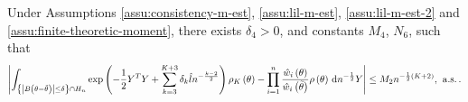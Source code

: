 \begin{lemma}
\label{lem:central-expansion-post-prod-2}%
 Under  Assumptions \ref{assu:consistency-m-est}, \ref{assu:lil-m-est}, \ref{assu:lil-m-est-2} and 
\ref{assu:finite-theoretic-moment},
  there exists  $\delta_{4}>0$, and constants
$M_{4}$, $N_{6}$, such that 
\begin{equation}
\left|\int_{\left\{ \left|B\left(\theta-\tilde{\theta}\right)\right|\le\delta\right\} \cap H_{n}}\exp\left(-\frac{1}{2}Y^{T}Y+\sum_{k=3}^{K+3}\delta_{k}\hat{l}n^{-\frac{k-2}{2}}\right)\rho_{K}\left(\theta\right)-\prod_{i=1}^{n}\frac{\hat{w}_{i}\left(\theta\right)}{\hat{w}_{i}\left(\tilde{\theta}\right)}\rho\left(\theta\right)\,\mathrm{d} n^{-\frac{1}{2}}Y\right|\le M_{2}n^{-\frac{1}{2}\left(K+2\right)},\:\,\mathrm{a.s.}\,.\label{eq:central-exp-post-2}
\end{equation}
\end{lemma}
